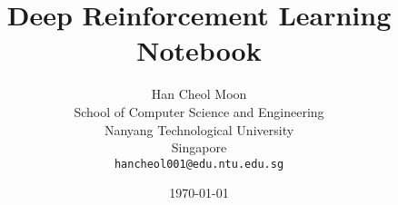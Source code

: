 \documentclass[oneside, a4paper,11pt]{book}
\begin{document}
\author{%
	Han Cheol Moon\\
	School of Computer Science and Engineering\\
	Nanyang Technological University\\
	Singapore\\
	\texttt{hancheol001@edu.ntu.edu.sg}
}
\title{Deep Reinforcement Learning Notebook}
\date{\today}

\frontmatter
\maketitle
\tableofcontents
\newpage

\mainmatter


\backmatter

\nocite{*}


\end{document}
